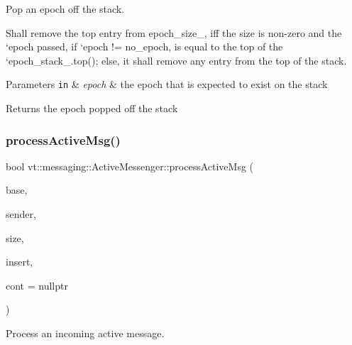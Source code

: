Pop an epoch off the stack. 

Shall remove the top entry from epoch\+\_\+size\+\_\+, iff the size is non-\/zero and the `epoch\textquotesingle{} passed, if `epoch != no\+\_\+epoch\textquotesingle{}, is equal to the top of the `epoch\+\_\+stack\+\_\+.top()\textquotesingle{}; else, it shall remove any entry from the top of the stack.


\begin{DoxyParams}[1]{Parameters}
\mbox{\tt in}  & {\em epoch} & the epoch that is expected to exist on the stack\\
\hline
\end{DoxyParams}
\begin{DoxyReturn}{Returns}
the epoch popped off the stack 
\end{DoxyReturn}
\mbox{\label{structvt_1_1messaging_1_1_active_messenger_acfbb060ad1d13a75d2a061cfde137194}} 
\subsubsection{\texorpdfstring{process\+Active\+Msg()}{processActiveMsg()}}
{\footnotesize\ttfamily bool vt\+::messaging\+::\+Active\+Messenger\+::process\+Active\+Msg (\begin{DoxyParamCaption}\item[{\hyperlink{structvt_1_1messaging_1_1_msg_shared_ptr}{Msg\+Shared\+Ptr}$<$ \hyperlink{namespacevt_a44d0d4e144748f2b19a1cfd962f50338}{Base\+Msg\+Type} $>$ const \&}]{base,  }\item[{\hyperlink{namespacevt_a866da9d0efc19c0a1ce79e9e492f47e2}{Node\+Type} const \&}]{sender,  }\item[{\hyperlink{namespacevt_abfa009d900299ac1df967b40ea8f2c8a}{Msg\+Size\+Type} const \&}]{size,  }\item[{bool}]{insert,  }\item[{\hyperlink{namespacevt_ae0a5a7b18cc99d7b732cb4d44f46b0f3}{Action\+Type}}]{cont = {\ttfamily nullptr} }\end{DoxyParamCaption})}



Process an incoming active message. 

